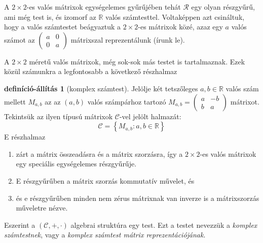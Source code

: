 \documentclass[9pt,showtrims]{memoir}
\theoremstyle{plain}
\theoremstyle{remark}
\theoremstyle{definition}
\newtheorem{defprop}[proposition]{definíció-állítás}
\renewcommand{\mathbf}{\mathbb}
\begin{document}
A $2\times 2$-es valós mátrixok egységelemes gyűrűjében tehát $\mathcal{R}$ egy olyan részgyűrű, ami még test is,
és izomorf az $\mathbf{R}$ valós számtesttel.
Voltaképpen azt csináltuk, hogy a valós számtestet beágyaztuk a $2\times 2$-es mátrixok közé,
azaz egy $a$ valós számot az
\begin{math}
    \begin{pmatrix}
        a&0\\
        0&a
    \end{pmatrix}
\end{math}
mátrixszal reprezentálunk (írunk le).

A $2\times 2$ méretű valós mátrixok, még sok-sok más testet is tartalmaznak. 
Ezek közül számunkra a legfontosabb a következő részhalmaz
\begin{defprop}[komplex számtest]
    Jelölje két tetszőleges $a,b\in\mathbf{R}$ valós szám mellett $M_{a,b}$ az 
    az $\left( a,b \right)$ valós számpárhoz tartozó 
    \(
        M_{a,b}
        =
        \begin{pmatrix}
            a&-b\\
            b&a
        \end{pmatrix}
    \)
    mátrixot.
    Tekintsük az ilyen típusú mátrixok $\mathcal{C}$-vel jelölt halmazát:
    \[
        \mathcal{C}
        =
        \left\{ 
            M_{a,b}
            :a,b\in\mathbf{R}
        \right\}
    \]
    E részhalmaz 
    \begin{enumerate}
        \item 
        zárt a mátrix összeadásra és a mátrix szorzásra, 
        így a $2\times 2$-es valós mátrixok egy speciális egységelemes részgyűrűje.
        \item
        E részgyűrűben a mátrix szorzás kommutatív művelet, 
        és 
    \item
        és e részgyűrűben minden nem zérus mátrixnak van inverze is a mátrixszorzás műveletre nézve.
    \end{enumerate}
    Eszerint a $\left( \mathcal{C},+,\cdot \right)$ algebrai struktúra egy test.
    Ezt a testet nevezzük a \emph{komplex számtestnek},
    vagy a \emph{komplex számtest mátrix reprezentációjának}.
\end{defprop}
\end{document}
